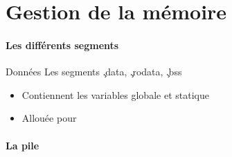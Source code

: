 %
%
%

\part{Gestion de la mémoire}


\begin{frame}
  \partpage
\end{frame}

\begin{frame}
  \tableofcontents
\end{frame}

\subsection{Les différents segments}

\begin{frame}[fragile=singleslide]{Données}
  Les segments \c{.data}, \c{.rodata}, \c{.bss}
  \begin{itemize}
  \item Contiennent les variables globale et statique
  \item Allouée pour 
  \end{itemize}
\end{frame}

\subsection{La pile}


